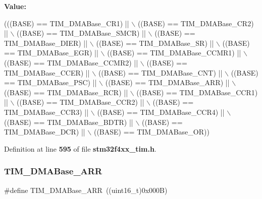 {\bfseries Value\+:}
\begin{DoxyCode}
(((BASE) == TIM_DMABase_CR1) || \(\backslash\)
                               ((BASE) == TIM_DMABase_CR2) || \(\backslash\)
                               ((BASE) == TIM_DMABase_SMCR) || \(\backslash\)
                               ((BASE) == TIM_DMABase_DIER) || \(\backslash\)
                               ((BASE) == TIM_DMABase_SR) || \(\backslash\)
                               ((BASE) == TIM_DMABase_EGR) || \(\backslash\)
                               ((BASE) == TIM_DMABase_CCMR1) || \(\backslash\)
                               ((BASE) == TIM_DMABase_CCMR2) || \(\backslash\)
                               ((BASE) == TIM_DMABase_CCER) || \(\backslash\)
                               ((BASE) == TIM_DMABase_CNT) || \(\backslash\)
                               ((BASE) == TIM_DMABase_PSC) || \(\backslash\)
                               ((BASE) == TIM_DMABase_ARR) || \(\backslash\)
                               ((BASE) == TIM_DMABase_RCR) || \(\backslash\)
                               ((BASE) == TIM_DMABase_CCR1) || \(\backslash\)
                               ((BASE) == TIM_DMABase_CCR2) || \(\backslash\)
                               ((BASE) == TIM_DMABase_CCR3) || \(\backslash\)
                               ((BASE) == TIM_DMABase_CCR4) || \(\backslash\)
                               ((BASE) == TIM_DMABase_BDTR) || \(\backslash\)
                               ((BASE) == TIM_DMABase_DCR) || \(\backslash\)
                               ((BASE) == TIM_DMABase_OR))
\end{DoxyCode}


Definition at line \textbf{ 595} of file \textbf{ stm32f4xx\+\_\+tim.\+h}.

\mbox{\label{group__TIM__DMA__Base__address_gaab8a66f70e59b5916b4bba344746d652}} 
\subsubsection{T\+I\+M\+\_\+\+D\+M\+A\+Base\+\_\+\+A\+RR}
{\footnotesize\ttfamily \#define T\+I\+M\+\_\+\+D\+M\+A\+Base\+\_\+\+A\+RR~((uint16\+\_\+t)0x000\+B)}



